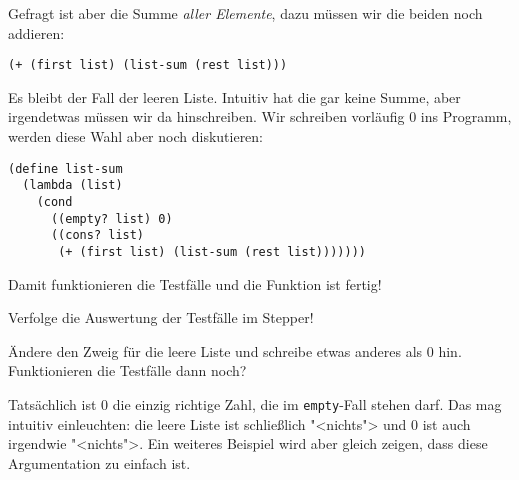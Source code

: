 %
Gefragt
ist aber die Summe \emph{aller Elemente}, dazu müssen wir die beiden
noch addieren:
%
\begin{lstlisting}
(+ (first list) (list-sum (rest list)))
\end{lstlisting}
%
Es bleibt der Fall der leeren Liste.  Intuitiv hat die gar keine
Summe, aber irgendetwas müssen wir da hinschreiben.  Wir schreiben 
vorläufig 0 ins Programm, werden diese Wahl aber noch diskutieren:
%
\begin{lstlisting}
(define list-sum
  (lambda (list)
    (cond
      ((empty? list) 0)
      ((cons? list)
       (+ (first list) (list-sum (rest list)))))))
\end{lstlisting}
%
Damit funktionieren die Testfälle und die Funktion ist fertig!

\begin{aufgabe}
  Verfolge die Auswertung der Testfälle im Stepper!
\end{aufgabe}

\begin{aufgabe}
  Ändere den Zweig für die leere Liste und schreibe etwas anderes als
  0 hin.  Funktionieren die Testfälle dann noch?
\end{aufgabe}
%
Tatsächlich ist 0 die einzig richtige Zahl, die im
\lstinline{empty}-Fall stehen darf.  Das mag intuitiv einleuchten: die
leere Liste ist schließlich "<nichts"> und 0 ist auch irgendwie
"<nichts">.  Ein weiteres Beispiel wird aber gleich zeigen, dass diese
Argumentation zu einfach ist.

